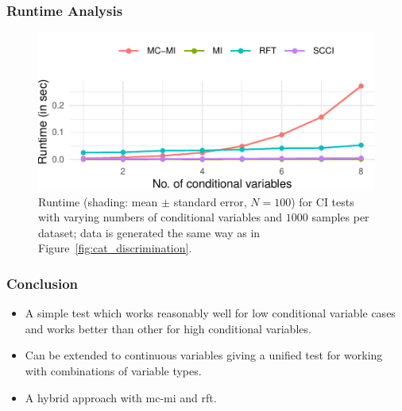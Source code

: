 \documentclass{beamer}
\begin{document}
\begin{frame}
	\frametitle{Runtime Analysis}
	\begin{figure}
		\centering
		\includegraphics{imgs/runtime.pdf}
		\caption{Runtime (shading: mean $\pm$ standard error, $N=100$)
		for CI tests with varying numbers of conditional variables and
		$1000$ samples per dataset; data is generated the same way as
		in Figure~\ref{fig:cat_discrimination}.}
	\end{figure}
\end{frame}

\begin{frame}
	\frametitle{Conclusion}
	\begin{itemize}
		\item A simple test which works reasonably well for low conditional variable
			cases and works better than other for high conditional variables.
		\item Can be extended to continuous variables giving a unified test for working with combinations of variable types.
		\item A hybrid approach with mc-mi and rft.
	\end{itemize}
\end{frame}
\end{document}
